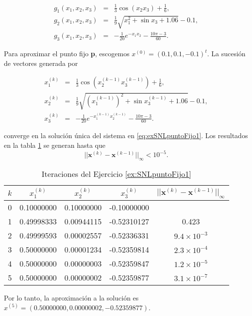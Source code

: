 \begin{exerciseT}
\begin{equation*}
  \begin{array}{ccl}
    g_1(x_1,x_2,x_3) & = & \frac{1}{3}\cos (x_2x_3) + \frac{1}{6},\\
    g_2(x_1,x_2,x_3) & = & \frac{1}{9}\sqrt{x_1^2 + \sin x_3 + 1.06} - 0.1,\\ 
    g_3(x_1,x_2,x_3) & = & -\frac{1}{20}e^{-x_1x_2}-\frac{10\pi-3}{60}.    
  \end{array}
\end{equation*}

Para aproximar el punto fijo \textbf{p}, escogemos $x^{(0)} = (0.1, 0.1, -0.1)^t$. La sucesión de vectores generada por

\begin{equation*}
  \begin{array}{ccl}
    x_1^{(k)} & = & \frac{1}{3}\cos \left(x_2^{(k-1)}x_3^{(k-1)}\right) + \frac{1}{6},\\
    x_2^{(k)} & = & \frac{1}{9}\sqrt{\left(x_1^{(k-1)}\right)^2 + \sin x_3^{(k-1)} + 1.06} - 0.1,\\ 
    x_3^{(k)} & = & -\frac{1}{20}e^{-x_1^{(k-1)}x_2^{(k-1)}}-\frac{10\pi-3}{60}.    
  \end{array}
\end{equation*}

converge en la solución única del sistema en \ref{eq:exSNLpuntoFijo1}. Los resultados en la tabla \ref{table:exSNLpuntoFijo1} se generan hasta que
\[||\textbf{x}^{(k)} - \textbf{x}^{(k-1)}||_\infty < 10^{-5}.\]

\begin{table}[H]
	\centering
	\begin{tabular}{ccccc}
		\toprule
		$k$ & $x_1^{(k)}$ & $x_2^{(k)}$ & $x_3^{(k)}$ & $||\textbf{x}^{(k)} - \textbf{x}^{(k-1)}||_\infty$ \\\midrule
		0 & 0.10000000 & 0.10000000 & -0.10000000 & \\
		1 & 0.49998333 & 0.00944115 & -0.52310127 & 0.423 \\
		2 & 0.49999593 & 0.00002557 & -0.52336331 & $9.4\times 10^{-3}$\\
		3 & 0.50000000 & 0.00001234 & -0.52359814 & $2.3\times 10^{-4}$\\
		4 & 0.50000000 & 0.00000003 & -0.52359847 & $1.2\times 10^{-5}$\\
		5 & 0.50000000 & 0.00000002 & -0.52359877 & $3.1\times 10^{-7}$\\
		\bottomrule
	\end{tabular}
	\caption{Iteraciones del Ejercicio \ref{ex:SNLpuntoFijo1}}
    \label{table:exSNLpuntoFijo1}
\end{table} 

Por lo tanto, la aproximación a la solución es $x^{(5)} = (0.50000000, 0.00000002, -0.52359877)$.  
 \label{ex:SNLpuntoFijo1}
\end{exerciseT}


